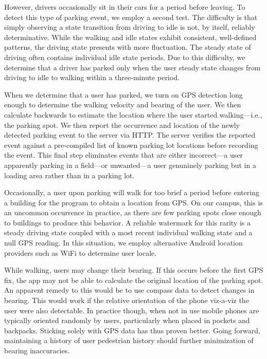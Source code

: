 \vfill\eject

However, drivers occasionally sit in their cars for a period before leaving.
To detect this type of parking event, we employ a second test. The difficulty is
that simply observing a state transition from driving to idle is
not, by itself, reliably determinative. While the walking and idle states
exhibit consistent, well-defined patterns, the driving state presents with
more fluctuation. The steady state of driving often contains individual idle
state periods. Due to this difficulty, we determine that a driver has parked
only when the user steady state changes from driving to idle to walking
within a three-minute period.

When we determine that a user has parked, we turn on GPS detection long enough
to determine the walking velocity and bearing of the user. We then calculate
backwards to estimate the location where the user started walking---i.e., the
parking spot. We then report the occurrence and location of the newly detected
parking event to the server via HTTP. The server verifies the reported event
against a pre-compiled list of known parking lot locations before recording the
event. This final step eliminates events that are either incorrect---a user
apparently parking in a field---or unwanted---a user genuninely parking but in a
loading area rather than in a parking lot.

Occasionally, a user upon parking will walk for too brief a period before
entering a building for the program to obtain a location from GPS. On our
campus, this is an uncommon occurrence in practice, as there are few parking
spots close enough to buildings to produce this behavior. A reliable watermark
for this rarity is a steady driving state coupled with a most recent
individual walking state and a null GPS reading. In this situation, we employ
alternative Android location providers such as WiFi to determine user locale.

While walking, users may change their bearing. If this occurs before the
first GPS fix, the app may not be able to calculate the original location of
the parking spot. An apparent remedy to this would be to use compass data to
detect changes in bearing. This would work if the relative orientation of the
phone viz-a-viz the user were also detectable. In practice though, when not
in use mobile phones are typically oriented randomly by users, particularly
when placed in pockets and backpacks. Sticking solely with GPS data has thus
proven better. Going forward, maintaining a history of user pedestrian
history should further minimization of bearing inaccuracies.


